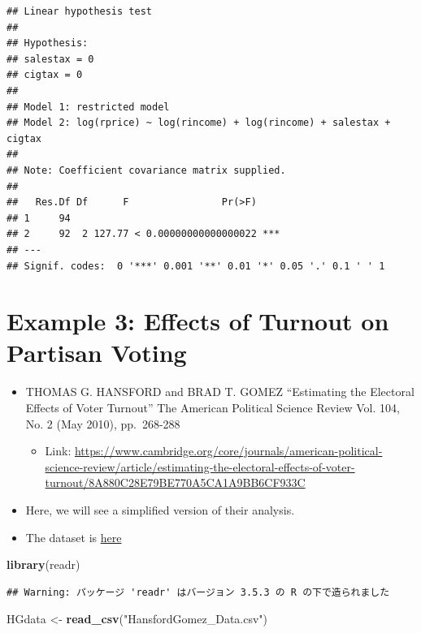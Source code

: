 \documentclass[]{book}
\newenvironment{Shaded}{\begin{snugshade}}{\end{snugshade}}
\newcommand{\KeywordTok}[1]{\textcolor[rgb]{0.13,0.29,0.53}{\textbf{#1}}}
\newcommand{\StringTok}[1]{\textcolor[rgb]{0.31,0.60,0.02}{#1}}
\newcommand{\NormalTok}[1]{#1}
\providecommand{\tightlist}{%
  \setlength{\itemsep}{0pt}\setlength{\parskip}{0pt}}
\begin{document}
\begin{verbatim}
## Linear hypothesis test
## 
## Hypothesis:
## salestax = 0
## cigtax = 0
## 
## Model 1: restricted model
## Model 2: log(rprice) ~ log(rincome) + log(rincome) + salestax + cigtax
## 
## Note: Coefficient covariance matrix supplied.
## 
##   Res.Df Df      F                Pr(>F)    
## 1     94                                    
## 2     92  2 127.77 < 0.00000000000000022 ***
## ---
## Signif. codes:  0 '***' 0.001 '**' 0.01 '*' 0.05 '.' 0.1 ' ' 1
\end{verbatim}

\section{Example 3: Effects of Turnout on Partisan
Voting}\label{example-3-effects-of-turnout-on-partisan-voting}

\begin{itemize}
\tightlist
\item
  THOMAS G. HANSFORD and BRAD T. GOMEZ ``Estimating the Electoral
  Effects of Voter Turnout'' The American Political Science Review Vol.
  104, No. 2 (May 2010), pp.~268-288

  \begin{itemize}
  \tightlist
  \item
    Link:
    \url{https://www.cambridge.org/core/journals/american-political-science-review/article/estimating-the-electoral-effects-of-voter-turnout/8A880C28E79BE770A5CA1A9BB6CF933C}
  \end{itemize}
\item
  Here, we will see a simplified version of their analysis.
\item
  The dataset is \href{HansfordGomez_Data.csv}{here}
\end{itemize}

\begin{Shaded}
\begin{Highlighting}[]
\KeywordTok{library}\NormalTok{(readr)}
\end{Highlighting}
\end{Shaded}

\begin{verbatim}
## Warning: パッケージ 'readr' はバージョン 3.5.3 の R の下で造られました
\end{verbatim}

\begin{Shaded}
\begin{Highlighting}[]
\NormalTok{HGdata <-}\StringTok{ }\KeywordTok{read_csv}\NormalTok{(}\StringTok{"HansfordGomez_Data.csv"}\NormalTok{)}
\end{Highlighting}
\end{Shaded}
\end{document}

